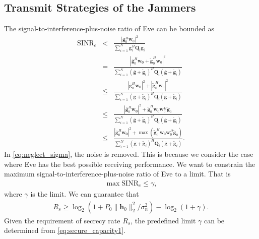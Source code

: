 \documentclass[conference]{IEEEtran}
\begin{document}
\subsection{Transmit Strategies of the Jammers}
The signal-to-interference-plus-noise ratio of Eve can be bounded as
\begin{eqnarray}
\mathrm{SINR}_e & < & \frac{\left| \mathbf{g}_{0}^H\mathbf{w}_{0}\right|^2}{\sum_{i=1}^{N}\mathbf{g}_{i}^H\mathbf{Q}_{i}\mathbf{g}_i} \label{eq:neglect_sigma}\\
&=& \frac{\left|\bar{\mathbf{g}}_0^H\mathbf{w_0} + \tilde{\mathbf{g}}_0^H\mathbf{w}_0\right|^2}{\sum_{i = 1}^N(\bar{\mathbf{g}}+\tilde{\mathbf{g}}_i)^H\mathbf{Q}_i(\bar{\mathbf{g}}+\tilde{\mathbf{g}}_i)}\\
&\leq & \frac{\left|\bar{\mathbf{g}}_0^H\mathbf{w_0}\right|^2 + \left|\tilde{\mathbf{g}}_0^H\mathbf{w}_0\right|^2}{\sum_{i = 1}^N(\bar{\mathbf{g}}+\tilde{\mathbf{g}}_i)^H\mathbf{Q}_i(\bar{\mathbf{g}}+\tilde{\mathbf{g}}_i)}\\
&\leq & \frac{\left|\bar{\mathbf{g}}_0^H\mathbf{w_0}\right|^2 + \tilde{\mathbf{g}}_0^H\mathbf{w}_0\mathbf{w}_0^H\tilde{\mathbf{g}}_0}{\sum_{i = 1}^N(\bar{\mathbf{g}}+\tilde{\mathbf{g}}_i)^H\mathbf{Q}_i(\bar{\mathbf{g}}+\tilde{\mathbf{g}}_i)}\\
& \leq & \frac{\left|\bar{\mathbf{g}}_0^H\mathbf{w_0}\right|^2 + \max(\tilde{\mathbf{g}}_0^H\mathbf{w}_0\mathbf{w}_0^H\tilde{\mathbf{g}}_0)}{\sum_{i = 1}^N(\bar{\mathbf{g}}+\tilde{\mathbf{g}}_i)^H\mathbf{Q}_i(\bar{\mathbf{g}}+\tilde{\mathbf{g}}_i)} .
\label{eq:SINR_e}
\end{eqnarray}
In \eqref{eq:neglect_sigma}, the noise is removed. This is because we consider the case where Eve has the best possible receiving performance. We want to constrain the maximum signal-to-interference-plus-noise ratio of Eve to a limit. That is 
\begin{eqnarray}
\max \mathrm{SINR}_e \leq \gamma \label{eq:SINR_constraint},
\end{eqnarray} 
where $\gamma$ is the limit. We can guarantee that
\begin{eqnarray}
R_s \geq \log_2\left(1 + P_0\|\mathbf{h}_0\|_2^2/\sigma_n^2\right) - \log_2\left(1 + \gamma\right). \label{eq:secure_capacity1}
\end{eqnarray}
Given the requirement of secrecy rate $R_s$, the predefined limit $\gamma$ can be determined from \eqref{eq:secure_capacity1}.
\end{document}
